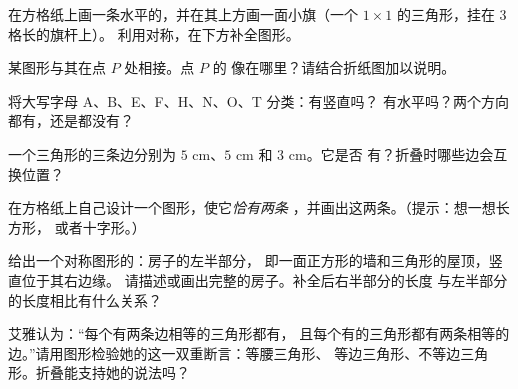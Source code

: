 \begin{exercise}[$\star$]\label{exo:g4:symmetry:5}
在方格纸上画一条水平的，并在其上方画一面小旗（一个 $1 \times
1$ 的三角形，挂在 $3$ 格长的旗杆上）。
利用对称，在下方补全图形。
\end{exercise}

\begin{exercise}[$\star$]\label{exo:g4:symmetry:6}
某图形与其在点 $P$ 处相接。点 $P$ 的
像在哪里？请结合折纸图加以说明。
\end{exercise}

\begin{exercise}[$\star$]\label{exo:g4:symmetry:7}
将大写字母 A、B、E、F、H、N、O、T 分类：有竖直吗？
有水平吗？两个方向都有，还是都没有？
\end{exercise}

\begin{exercise}[$\star$]\label{exo:g4:symmetry:8}
一个三角形的三条边分别为 $5$ cm、$5$ cm 和 $3$ cm。它是否
有？折叠时哪些边会互换位置？
\end{exercise}

\begin{exercise}[$\star\star$]\label{exo:g4:symmetry:9}
在方格纸上自己设计一个图形，使它\emph{恰有两条}
，并画出这两条。（提示：想一想长方形，
或者十字形。）
\end{exercise}

\begin{exercise}[$\star\star$]\label{exo:g4:symmetry:10}
给出一个对称图形的：房子的左半部分，
即一面正方形的墙和三角形的屋顶，竖直位于其右边缘。
请描述或画出完整的房子。补全后右半部分的长度
与左半部分的长度相比有什么关系？
\end{exercise}

\begin{exercise}[$\star\star$]\label{exo:g4:symmetry:11}
艾雅认为：“每个有两条边相等的三角形都有，
且每个有的三角形都有两条相等的
边。”请用图形检验她的这一双重断言：等腰三角形、
等边三角形、不等边三角形。折叠能支持她的说法吗？
\end{exercise}
